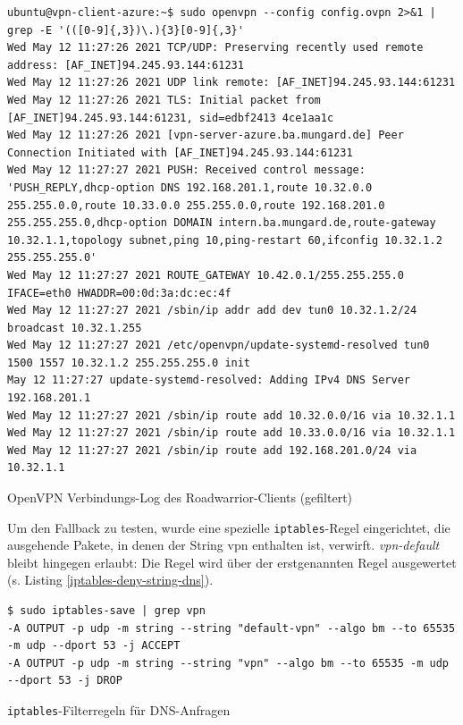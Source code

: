 \begin{listing}[h]
\begin{verbatim}
ubuntu@vpn-client-azure:~$ sudo openvpn --config config.ovpn 2>&1 | grep -E '(([0-9]{,3})\.){3}[0-9]{,3}'
Wed May 12 11:27:26 2021 TCP/UDP: Preserving recently used remote address: [AF_INET]94.245.93.144:61231
Wed May 12 11:27:26 2021 UDP link remote: [AF_INET]94.245.93.144:61231
Wed May 12 11:27:26 2021 TLS: Initial packet from [AF_INET]94.245.93.144:61231, sid=edbf2413 4ce1aa1c
Wed May 12 11:27:26 2021 [vpn-server-azure.ba.mungard.de] Peer Connection Initiated with [AF_INET]94.245.93.144:61231
Wed May 12 11:27:27 2021 PUSH: Received control message: 'PUSH_REPLY,dhcp-option DNS 192.168.201.1,route 10.32.0.0 255.255.0.0,route 10.33.0.0 255.255.0.0,route 192.168.201.0 255.255.255.0,dhcp-option DOMAIN intern.ba.mungard.de,route-gateway 10.32.1.1,topology subnet,ping 10,ping-restart 60,ifconfig 10.32.1.2 255.255.255.0'
Wed May 12 11:27:27 2021 ROUTE_GATEWAY 10.42.0.1/255.255.255.0 IFACE=eth0 HWADDR=00:0d:3a:dc:ec:4f
Wed May 12 11:27:27 2021 /sbin/ip addr add dev tun0 10.32.1.2/24 broadcast 10.32.1.255
Wed May 12 11:27:27 2021 /etc/openvpn/update-systemd-resolved tun0 1500 1557 10.32.1.2 255.255.255.0 init
May 12 11:27:27 update-systemd-resolved: Adding IPv4 DNS Server 192.168.201.1
Wed May 12 11:27:27 2021 /sbin/ip route add 10.32.0.0/16 via 10.32.1.1
Wed May 12 11:27:27 2021 /sbin/ip route add 10.33.0.0/16 via 10.32.1.1
Wed May 12 11:27:27 2021 /sbin/ip route add 192.168.201.0/24 via 10.32.1.1

\end{verbatim}
\caption{OpenVPN Verbindungs-Log des Roadwarrior-Clients (gefiltert)}
\label{openvpn-connect-log}
\end{listing}\FloatBarrier
\newpage
Um den \gls{Fallback} zu testen, wurde eine spezielle \texttt{\gls{iptables}}-Regel eingerichtet, die ausgehende Pakete, in denen der String \glqq vpn\grqq{} enthalten ist, verwirft. \textit{vpn-default} bleibt hingegen erlaubt: Die Regel wird über der erstgenannten Regel ausgewertet (s. Listing \ref{iptables-deny-string-dns}).
\begin{listing}[h]
\begin{verbatim}
$ sudo iptables-save | grep vpn
-A OUTPUT -p udp -m string --string "default-vpn" --algo bm --to 65535 -m udp --dport 53 -j ACCEPT
-A OUTPUT -p udp -m string --string "vpn" --algo bm --to 65535 -m udp --dport 53 -j DROP

\end{verbatim}
\caption{\texttt{iptables}-Filterregeln für DNS-Anfragen}
\label{iptables-deny-string-dns}
\end{listing}\FloatBarrier
